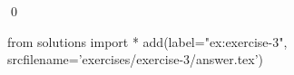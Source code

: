 
\begin{ex} 
  \label{ex:exercise-3}
  
  \qed
\end{ex} 
\begin{python0}
from solutions import *
add(label="ex:exercise-3",
    srcfilename='exercises/exercise-3/answer.tex') 
\end{python0}
